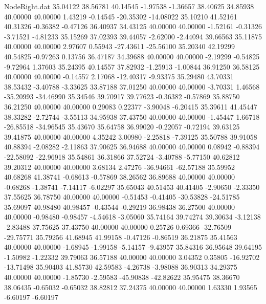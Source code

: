 \begin{filecontents}{NodeRight.dat}
  35.04122   38.56781   40.14545    -1.97538   -1.36657   38.40625   34.85938   40.00000   40.00000    1.43219   -0.14545  -20.35302  -14.08022
  35.10210   41.52161   40.31326    -0.36382   -0.47126   36.40937   34.43125   40.00000   40.00000   -1.52161   -0.31326   -3.71521   -4.81233
  35.15269   37.02393   39.44057    -2.62000   -2.44094   39.66563   35.11875   40.00000   40.00000    2.97607    0.55943  -27.43611  -25.56100
  35.20340   42.19299   40.54825    -0.97263    0.13756   36.47187   34.39688   40.00000   40.00000   -2.19299   -0.54825   -9.72964    1.37603
  35.24395   40.14557   37.82932    -1.25913   -1.00844   36.91250   36.58125   40.00000   40.00000   -0.14557    2.17068  -12.40317   -9.93375
  35.29480   43.70331   38.53432    -3.40788   -3.33625   33.87188   37.01250   40.00000   40.00000   -3.70331    1.46568  -35.20993  -34.46990
  35.34546   39.70917   39.77623    -0.36382   -0.57869   35.88750   36.21250   40.00000   40.00000    0.29083    0.22377   -3.90048   -6.20415
  35.39611   41.45447   38.33282    -2.72744   -3.55113   34.95938   37.43750   40.00000   40.00000   -1.45447    1.66718  -26.85518  -34.96545
  35.43670   35.64758   36.99020    -0.22057   -0.72194   39.63125   39.41875   40.00000   40.00000    4.35242    3.00980   -2.25818   -7.39125
  35.50788   39.91058   40.88394    -2.08282   -2.11863   37.90625   36.94688   40.00000   40.00000    0.08942   -0.88394  -22.58092  -22.96918
  35.54861   36.31866   37.52724    -3.40788   -5.77150   40.62812   39.20312   40.00000   40.00000    3.68134    2.47276  -36.94661  -62.57188
  35.59952   40.68268   41.38741    -0.68613   -0.57869   38.26562   36.89688   40.00000   40.00000   -0.68268   -1.38741   -7.14117   -6.02297
  35.65043   40.51453   40.41405    -2.90650   -2.33350   37.55625   36.78750   40.00000   40.00000   -0.51453   -0.41405  -30.53828  -24.51785
  35.69097   40.98480   40.98457    -0.43544   -0.29219   36.98438   36.27500   40.00000   40.00000   -0.98480   -0.98457   -4.54618   -3.05060
  35.74164   39.74274   39.30634    -3.12138   -2.83488   37.75625   37.43750   40.00000   40.00000    0.25726    0.69366  -32.76509  -29.75771
  35.79256   41.68945   41.99158    -0.47126   -0.86519   36.21875   35.41563   40.00000   40.00000   -1.68945   -1.99158   -5.14157   -9.43957
  35.84316   36.95648   39.64195    -1.50982   -1.22332   39.79063   36.57188   40.00000   40.00000    3.04352    0.35805  -16.92702  -13.71498
  35.90403   41.85730   42.59583    -4.26738   -3.98088   36.90313   34.29375   40.00000   40.00000   -1.85730   -2.59583  -45.90838  -42.82622
  35.95475   38.36670   38.06435    -0.65032   -0.65032   38.82812   37.24375   40.00000   40.00000    1.63330    1.93565   -6.60197   -6.60197

\end{filecontents}
